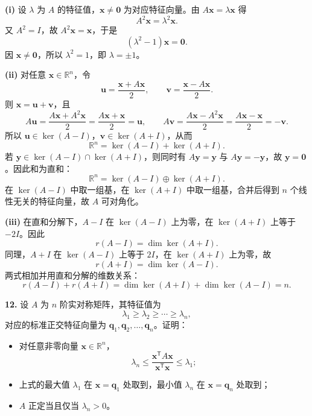 \textbf{(i)} 设 \(\lambda\) 为 \(A\) 的特征值，\(\boldsymbol{x}\ne\boldsymbol{0}\) 为对应特征向量。由 \(A\boldsymbol{x}=\lambda\boldsymbol{x}\) 得
\[
A^2\boldsymbol{x}=\lambda^2\boldsymbol{x}.
\]
又 \(A^2=I\)，故 \(A^2\boldsymbol{x}=\boldsymbol{x}\)，于是
\[
(\lambda^2-1)\boldsymbol{x}=\boldsymbol{0}.
\]
因 \(\boldsymbol{x}\ne\boldsymbol{0}\)，所以 \(\lambda^2=1\)，即 \(\lambda=\pm1\)。

\textbf{(ii)} 对任意 \(\boldsymbol{x}\in\mathbb R^n\)，令
\[
\boldsymbol{u}=\frac{\boldsymbol{x}+A\boldsymbol{x}}2,\qquad
\boldsymbol{v}=\frac{\boldsymbol{x}-A\boldsymbol{x}}2.
\]
则 \(\boldsymbol{x}=\boldsymbol{u}+\boldsymbol{v}\)，且
\[
A\boldsymbol{u}=\frac{A\boldsymbol{x}+A^2\boldsymbol{x}}2
=\frac{A\boldsymbol{x}+\boldsymbol{x}}2=\boldsymbol{u},
\qquad
A\boldsymbol{v}=\frac{A\boldsymbol{x}-A^2\boldsymbol{x}}2
=\frac{A\boldsymbol{x}-\boldsymbol{x}}2=-\boldsymbol{v}.
\]
所以 \(\boldsymbol{u}\in\ker(A-I)\)，\(\boldsymbol{v}\in\ker(A+I)\)，从而
\[
\mathbb R^n=\ker(A-I)+\ker(A+I).
\]
若 \(\boldsymbol{y}\in\ker(A-I)\cap\ker(A+I)\)，则同时有 \(A\boldsymbol{y}=\boldsymbol{y}\) 与 \(A\boldsymbol{y}=-\boldsymbol{y}\)，故 \(\boldsymbol{y}=\boldsymbol{0}\)。因此和为直和：
\[
\mathbb R^n=\ker(A-I)\oplus\ker(A+I).
\]
在 \(\ker(A-I)\) 中取一组基，在 \(\ker(A+I)\) 中取一组基，合并后得到 \(n\) 个线性无关的特征向量，故 \(A\) 可对角化。

\textbf{(iii)} 在直和分解下，\(A-I\) 在 \(\ker(A-I)\) 上为零，在 \(\ker(A+I)\) 上等于 \(-2I\)。因此
\[
r(A-I)=\dim\ker(A+I).
\]
同理，\(A+I\) 在 \(\ker(A-I)\) 上等于 \(2I\)，在 \(\ker(A+I)\) 上为零，故
\[
r(A+I)=\dim\ker(A-I).
\]
两式相加并用直和分解的维数关系：
\[
r(A-I)+r(A+I)=\dim\ker(A+I)+\dim\ker(A-I)=n.
\]
\else \answerarea[10] \fi%

\textbf{12.} 设 \(A\) 为 \(n\) 阶实对称矩阵，其特征值为
\[
\lambda_1\ge\lambda_2\ge\cdots\ge\lambda_n,
\]
对应的标准正交特征向量为 \(\boldsymbol{q}_1,\boldsymbol{q}_2,\dots,\boldsymbol{q}_n\)。证明：
\begin{itemize}
  \item[(i)] 对任意非零向量 \(\boldsymbol{x}\in\mathbb R^n\)，
  \[
  \lambda_n\le\frac{\boldsymbol{x}^{\mathsf T}A\boldsymbol{x}}{\boldsymbol{x}^{\mathsf T}\boldsymbol{x}}\le\lambda_1;
  \]
  \item[(ii)] 上式的最大值 \(\lambda_1\) 在 \(\boldsymbol{x}=\boldsymbol{q}_1\) 处取到，最小值 \(\lambda_n\) 在 \(\boldsymbol{x}=\boldsymbol{q}_n\) 处取到；
  \item[(iii)] \(A\) 正定当且仅当 \(\lambda_n>0\)。
\end{itemize}

